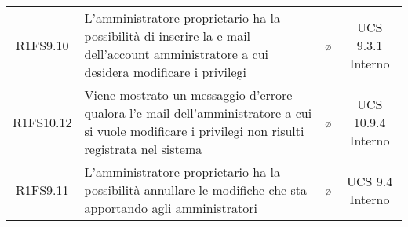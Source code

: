 {\begin{longtable}{ c C{4cm} c c}
R1FS9.10 & L'amministratore proprietario ha la possibilità di inserire la e-mail dell'account amministratore a cui desidera modificare i privilegi & \o & UCS 9.3.1 Interno\\
R1FS10.12 & Viene mostrato un messaggio d'errore qualora l'e-mail dell'amministratore a cui si vuole modificare i privilegi non risulti registrata nel sistema & \o & UCS 10.9.4 Interno\\
R1FS9.11 & L'amministratore proprietario ha la possibilità annullare le modifiche che sta apportando agli amministratori & \o & UCS 9.4 Interno\\



\end{longtable}
}